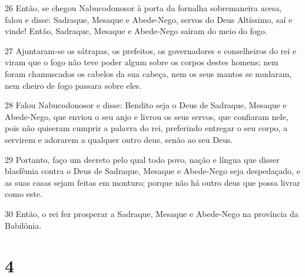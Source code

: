 \par 26 Então, se chegou Nabucodonosor à porta da fornalha sobremaneira acesa, falou e disse: Sadraque, Mesaque e Abede-Nego, servos do Deus Altíssimo, saí e vinde! Então, Sadraque, Mesaque e Abede-Nego saíram do meio do fogo.
\par 27 Ajuntaram-se os sátrapas, os prefeitos, os governadores e conselheiros do rei e viram que o fogo não teve poder algum sobre os corpos destes homens; nem foram chamuscados os cabelos da sua cabeça, nem os seus mantos se mudaram, nem cheiro de fogo passara sobre eles.
\par 28 Falou Nabucodonosor e disse: Bendito seja o Deus de Sadraque, Mesaque e Abede-Nego, que enviou o seu anjo e livrou os seus servos, que confiaram nele, pois não quiseram cumprir a palavra do rei, preferindo entregar o seu corpo, a servirem e adorarem a qualquer outro deus, senão ao seu Deus.
\par 29 Portanto, faço um decreto pelo qual todo povo, nação e língua que disser blasfêmia contra o Deus de Sadraque, Mesaque e Abede-Nego seja despedaçado, e as suas casas sejam feitas em monturo; porque não há outro deus que possa livrar como este.
\par 30 Então, o rei fez prosperar a Sadraque, Mesaque e Abede-Nego na província da Babilônia.

\chapter{4}

